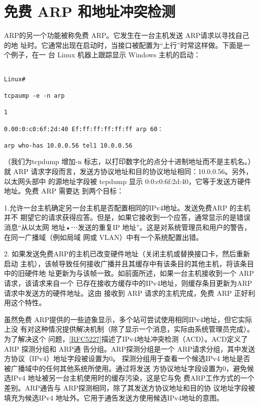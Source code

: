 \section{免费 ARP 和地址冲突检测}

ARP的另一个功能被称免费 ARP。它发生在一台主机发送 ARP请求以寻找自己的地
址时。它通常出现在启动时，当接口被配置为“上行”时常这样做。下面是一个例子，在一
台 Linux 机器上跟踪显示 Windows 主机的启动：

\begin{verbatim}
    
Linux#

tcpaump -e -n arp

1

0.00:0:c0:6f:2d:40 Ef:ff:ff:ff:ff:ff arp 60：

arp who-has 10.0.0.56 tel1 10.0.0.56
\end{verbatim}

（我们为tcpdump 增加-n 标志，以打印数字化的点分十进制地址而不是主机名。）就
ARP 请求字段而言，发送方协议地址和目的协议地址相同：10.0.0.56。另外，以太网头部中
的源地址字段被 tcpdump 显示 0:0:c0:6f:2d:40，它等于发送方硬件地址。免费 ARP 需要达
到两个目标：

1.允许一台主机确定另一台主机是否配置相同的IPv4地址。发送免费ARP 的主机并不
期望它的请求获得应答。但是，如果它接收到一个应答，通常显示的是错误消息“从以太网
地址•⋯发送的重复IP 地址”。这是对系统管理员和用户的警告，在同一广播域（例如局域
网或 VLAN）中有一个系统配置出错。

2. 如果发送免费ARP的主机已改变硬件地址（关闭主机或替换接口卡，然后重新启动
主机），该帧导致任何接收广播并且其缓存中有该条目的其他主机，将该条目中的旧硬件地
址更新为与该帧一致。如前面所述，如果一台主机接收到一个 ARP 请求，该请求来自一个
已存在接收方缓存中的IPv4地址，则缓存条目更新为ARP 请求中发送方的硬件地址。这由
接收到 ARP 请求的主机完成，免费 ARP 正好利用这个特性。

虽然免费 ARP提供的一些迹象显示，多个站可尝试使用相同IPv4地址，但它实际上没
有对这种情况提供解决机制（除了显示一个消息，实际由系统管理员完成）。为了解决这个
问题，\href{https://www.rfc-editor.org/rfc/rfc5227}{[RFC5227]}描述了IPv4地址冲突检测（ACD）。ACD定义了 ARP 探测分组和 ARP通
告分组。ARP探测分组是一个 ARP请求分组，其中发送方协议（IPv4）地址字段被设置为0。
探测分组用于查看一个候选IPv4 地址是否被广播域中的任何其他系统所使用。通过将发送
方协议地址字段设置为0，避免候选IPv4 地址被另一台主机使用时的缓存污染，这是它与免
费ARP工作方式的一个差别。ARP通告与 ARP探测相同，除了其发送方协议地址和目的协
议地址字段被填充为候选IPv4 地址外。它用于通告发送方使用候选IPv4地址的意图。


